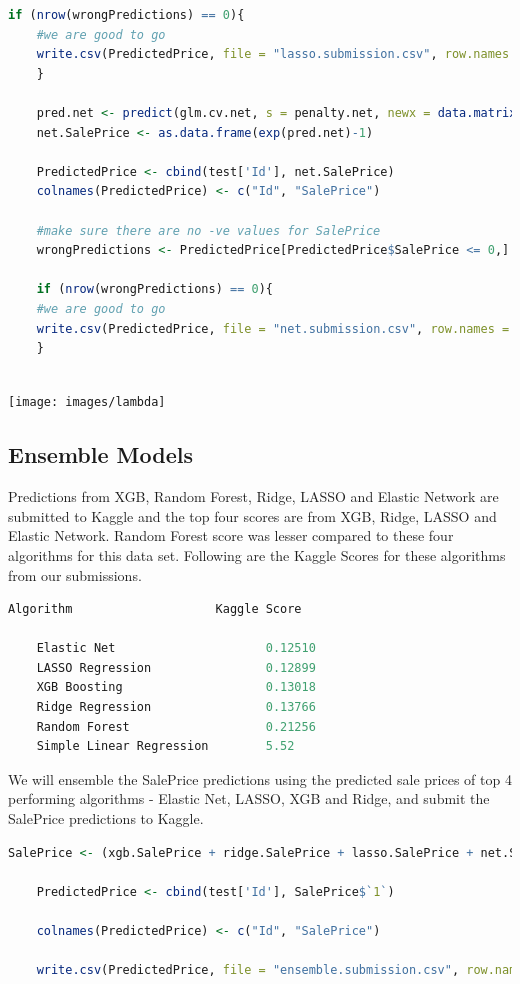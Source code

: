 \documentclass[sigconf]{acmart}
\begin{document}
\begin{lstlisting}[language=R]
	if (nrow(wrongPredictions) == 0){
	#we are good to go
	write.csv(PredictedPrice, file = "lasso.submission.csv", row.names = F)
	}
	
	pred.net <- predict(glm.cv.net, s = penalty.net, newx = data.matrix(test_dat))
	net.SalePrice <- as.data.frame(exp(pred.net)-1)
	
	PredictedPrice <- cbind(test['Id'], net.SalePrice)
	colnames(PredictedPrice) <- c("Id", "SalePrice")
	
	#make sure there are no -ve values for SalePrice
	wrongPredictions <- PredictedPrice[PredictedPrice$SalePrice <= 0,]
	
	if (nrow(wrongPredictions) == 0){
	#we are good to go
	write.csv(PredictedPrice, file = "net.submission.csv", row.names = F)
	}
	
	\end{lstlisting}
	
	\begin{center}		
		\texttt{[image: images/lambda]}	
	\end{center}
	
	\subsection{Ensemble Models}
	Predictions from XGB, Random Forest, Ridge, LASSO and Elastic Network are submitted to Kaggle and the top four scores are from XGB, Ridge, LASSO and Elastic Network. Random Forest score was lesser compared to these four algorithms for this data set. Following are the Kaggle Scores for these algorithms from our submissions.
	
	\begin{lstlisting}[language=R]
	Algorithm                    Kaggle Score
	
	Elastic Net                     0.12510
	LASSO Regression                0.12899
	XGB Boosting                    0.13018
	Ridge Regression                0.13766
	Random Forest                   0.21256
	Simple Linear Regression        5.52
	\end{lstlisting}
	
	We will ensemble the SalePrice predictions using the predicted sale prices of top 4 performing algorithms - Elastic Net, LASSO, XGB and Ridge, and submit the SalePrice predictions to Kaggle.
	
	\begin{lstlisting}[language=R]
	SalePrice <- (xgb.SalePrice + ridge.SalePrice + lasso.SalePrice + net.SalePrice)/4.0
	
	PredictedPrice <- cbind(test['Id'], SalePrice$`1`)
	
	colnames(PredictedPrice) <- c("Id", "SalePrice")
	
	write.csv(PredictedPrice, file = "ensemble.submission.csv", row.names = F)
	
	\end{lstlisting}
	
\end{document}
